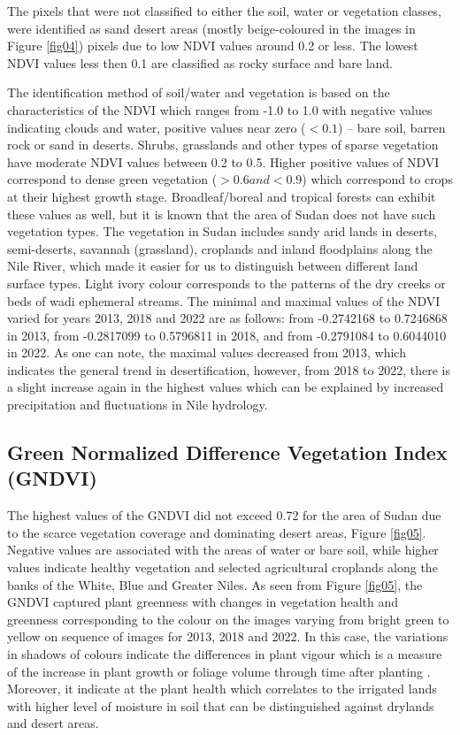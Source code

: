 \documentclass[jimaging,article,submit,pdftex,moreauthors]{Definitions/mdpi}
\begin{document}
The pixels that were not classified to either the soil, water or vegetation classes, were identified as sand desert areas (mostly beige-coloured in the images in Figure \ref{fig04}) pixels due to low NDVI values around 0.2 or less. The lowest NDVI values less then 0.1 are classified as rocky surface and bare land. 

The identification method of soil/water and vegetation is based on the characteristics of the NDVI which ranges from -1.0 to 1.0 with negative values indicating clouds and water, positive values near zero ($<0.1$) -- bare soil, barren rock or sand in deserts. Shrubs, grasslands and other types of sparse vegetation have moderate NDVI values between 0.2 to 0.5. Higher positive values of NDVI correspond to dense green vegetation ($>0.6 and <0.9$) which correspond to crops at their highest growth stage. Broadleaf/boreal and tropical forests can exhibit these values as well, but it is known that the area of Sudan does not have such vegetation types. The vegetation in Sudan includes sandy arid lands in deserts, semi-deserts, savannah (grassland), croplands and inland floodplains along the Nile River, which made it easier for us to distinguish between different land surface types. Light ivory colour corresponds to the patterns of the dry creeks or beds of wadi ephemeral streams. The minimal and maximal values of the NDVI varied for years 2013, 2018 and 2022 are as follows: from -0.2742168 to 0.7246868 in 2013, from -0.2817099 to 0.5796811 in 2018, and from -0.2791084 to 0.6044010 in 2022. As one can note, the maximal values decreased from 2013, which indicates the general trend in desertification, however, from 2018 to 2022, there is a slight increase again in the highest values which can be explained by increased precipitation and fluctuations in Nile hydrology. 

\subsection{Green Normalized Difference Vegetation Index (GNDVI)}

The highest values of the GNDVI did not exceed 0.72 for the area of Sudan due to the scarce vegetation coverage and dominating desert areas, Figure \ref{fig05}. Negative values are associated with the areas of water or bare soil, while higher values indicate healthy vegetation and selected agricultural croplands along the banks of the White, Blue and Greater Niles. As seen from Figure \ref{fig05}, the GNDVI captured plant greenness with changes in vegetation health and greenness corresponding to the colour on the images varying from bright green to yellow on sequence of images for 2013, 2018 and 2022. In this case, the variations in shadows of colours indicate the differences in plant vigour which is a measure of the increase in plant growth or foliage volume through time after planting \cite{Dictionary}. Moreover, it indicate at the plant health which correlates to the irrigated lands with higher level of moisture in soil that can be distinguished against drylands and desert areas. 
\end{document}

